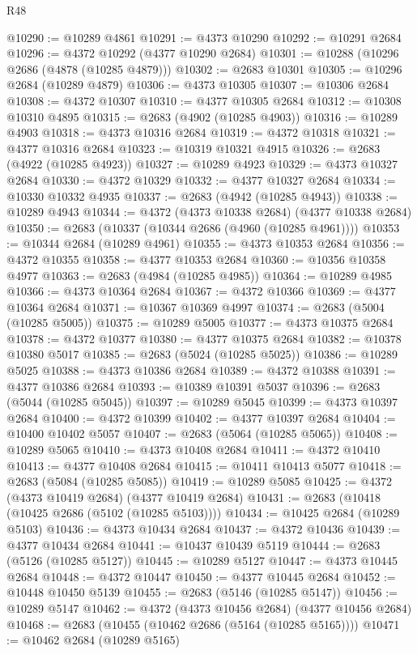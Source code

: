 \begin{lexlean}{R48}
\begin{coremodule}
@10290 := @10289 @4861
@10291 := @4373 @10290
@10292 := @10291 @2684
@10296 := @4372 @10292 (@4377 @10290 @2684)
@10301 := @10288 (@10296 @2686 (@4878 (@10285 @4879)))
@10302 := @2683 @10301
@10305 := @10296 @2684 (@10289 @4879)
@10306 := @4373 @10305
@10307 := @10306 @2684
@10308 := @4372 @10307
@10310 := @4377 @10305 @2684
@10312 := @10308 @10310 @4895
@10315 := @2683 (@4902 (@10285 @4903))
@10316 := @10289 @4903
@10318 := @4373 @10316 @2684
@10319 := @4372 @10318
@10321 := @4377 @10316 @2684
@10323 := @10319 @10321 @4915
@10326 := @2683 (@4922 (@10285 @4923))
@10327 := @10289 @4923
@10329 := @4373 @10327 @2684
@10330 := @4372 @10329
@10332 := @4377 @10327 @2684
@10334 := @10330 @10332 @4935
@10337 := @2683 (@4942 (@10285 @4943))
@10338 := @10289 @4943
@10344 := @4372 (@4373 @10338 @2684) (@4377 @10338 @2684)
@10350 := @2683 (@10337 (@10344 @2686 (@4960 (@10285 @4961))))
@10353 := @10344 @2684 (@10289 @4961)
@10355 := @4373 @10353 @2684
@10356 := @4372 @10355
@10358 := @4377 @10353 @2684
@10360 := @10356 @10358 @4977
@10363 := @2683 (@4984 (@10285 @4985))
@10364 := @10289 @4985
@10366 := @4373 @10364 @2684
@10367 := @4372 @10366
@10369 := @4377 @10364 @2684
@10371 := @10367 @10369 @4997
@10374 := @2683 (@5004 (@10285 @5005))
@10375 := @10289 @5005
@10377 := @4373 @10375 @2684
@10378 := @4372 @10377
@10380 := @4377 @10375 @2684
@10382 := @10378 @10380 @5017
@10385 := @2683 (@5024 (@10285 @5025))
@10386 := @10289 @5025
@10388 := @4373 @10386 @2684
@10389 := @4372 @10388
@10391 := @4377 @10386 @2684
@10393 := @10389 @10391 @5037
@10396 := @2683 (@5044 (@10285 @5045))
@10397 := @10289 @5045
@10399 := @4373 @10397 @2684
@10400 := @4372 @10399
@10402 := @4377 @10397 @2684
@10404 := @10400 @10402 @5057
@10407 := @2683 (@5064 (@10285 @5065))
@10408 := @10289 @5065
@10410 := @4373 @10408 @2684
@10411 := @4372 @10410
@10413 := @4377 @10408 @2684
@10415 := @10411 @10413 @5077
@10418 := @2683 (@5084 (@10285 @5085))
@10419 := @10289 @5085
@10425 := @4372 (@4373 @10419 @2684) (@4377 @10419 @2684)
@10431 := @2683 (@10418 (@10425 @2686 (@5102 (@10285 @5103))))
@10434 := @10425 @2684 (@10289 @5103)
@10436 := @4373 @10434 @2684
@10437 := @4372 @10436
@10439 := @4377 @10434 @2684
@10441 := @10437 @10439 @5119
@10444 := @2683 (@5126 (@10285 @5127))
@10445 := @10289 @5127
@10447 := @4373 @10445 @2684
@10448 := @4372 @10447
@10450 := @4377 @10445 @2684
@10452 := @10448 @10450 @5139
@10455 := @2683 (@5146 (@10285 @5147))
@10456 := @10289 @5147
@10462 := @4372 (@4373 @10456 @2684) (@4377 @10456 @2684)
@10468 := @2683 (@10455 (@10462 @2686 (@5164 (@10285 @5165))))
@10471 := @10462 @2684 (@10289 @5165)

\end{coremodule}
\end{lexlean}
